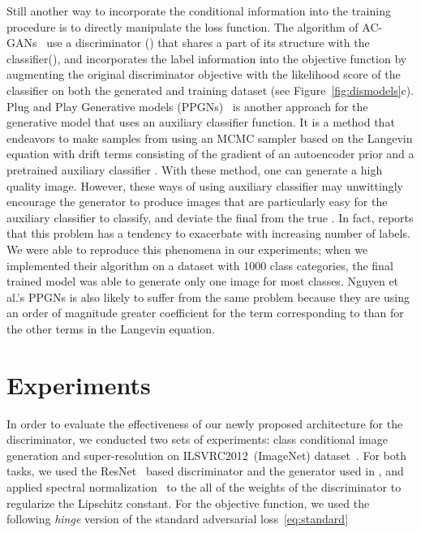 \documentclass{article}
\begin{document}
Still another way to incorporate the conditional information into the training procedure is to directly manipulate the loss function.
The algorithm of AC-GANs~\cite[]{odena2016conditional} use a discriminator () that shares a part of its structure with the classifier(), and 
 incorporates the label information into the objective function by augmenting the original discriminator objective with the likelihood score of the classifier on both the generated and training dataset (see Figure~\ref{fig:dismodels}c). 
Plug and Play Generative models (PPGNs)~\cite[]{nguyen2017plug} is another approach for the generative model that uses an auxiliary classifier function. It is a method that endeavors to make samples from  using an MCMC sampler based on the Langevin equation with drift terms consisting of the gradient of an autoencoder prior  and a pretrained auxiliary classifier .
With these method, one can generate a high quality image. 
However, these ways of using auxiliary classifier may unwittingly encourage the generator to produce images that are particularly easy for the auxiliary classifier to classify, and deviate the final  from the true . 
In fact, \cite{odena2016conditional} reports that this problem has a tendency to exacerbate with increasing number of labels. 
We were able to reproduce this phenomena in our experiments; when we implemented their algorithm on a dataset with 1000 class categories, the final trained model was able to generate only one image for most classes.
Nguyen et al.'s PPGNs is also likely to suffer from the same problem because they are using an order of magnitude greater coefficient for the term corresponding to  than for the other terms in the Langevin equation. 


\section{\label{sec:experiments} Experiments}
In order to evaluate the effectiveness of our newly proposed architecture for the discriminator, we conducted two sets of 
experiments: class conditional image generation and super-resolution on ILSVRC2012~(ImageNet) dataset~\cite[]{ILSVRC15}.   
For both tasks, we used the ResNet~\cite[]{he2016identity} based discriminator and the generator used in \cite{gulrajani2017improved}, and applied spectral normalization~\cite[]{miyato2018spectral} to the all of the weights of the discriminator to regularize the Lipschitz constant.
For the objective function, we used the following \textit{hinge} version of the standard adversarial loss~\eqref{eq:standard}~\cite[]{lim2017geometric, tran2017deep}
\end{document}
